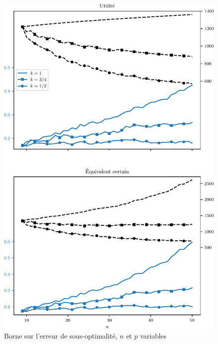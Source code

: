 \begin{figure}[h]
  \centering
  \includegraphics[width=\textwidth]{../../experiments/fig/np_sobound.pdf}  
  \caption[à faire]{Borne sur l'erreur de sous-optimalité, $n$ et $p$ variables}
  \label{fig_np_sobound}
\end{figure}

